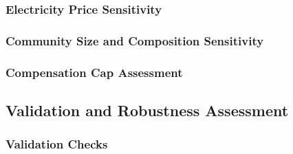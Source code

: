 \subsubsection{Electricity Price Sensitivity}
\label{subsec:electricity_price_sensitivity}

\subsubsection{Community Size and Composition Sensitivity}
\label{subsec:community_size_composition_sensitivity}

\subsubsection{Compensation Cap Assessment}
\label{subsec:compensation_cap_assessment}

\subsection{Validation and Robustness Assessment}
\label{subsec:validation_robustness_assessment}

\subsubsection{Validation Checks}
\label{subsec:validation_checks}


